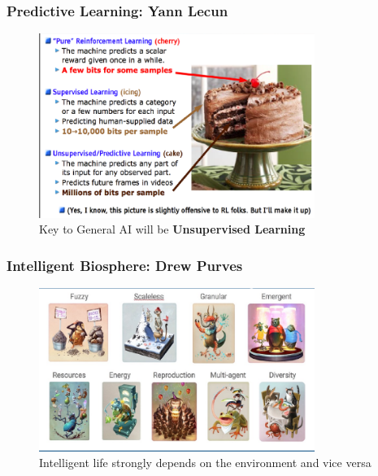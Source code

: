 \documentclass[11pt,
               hyperref={colorlinks,citecolor=pink,linkcolor=red,urlcolor=blue}
               ]{beamer}
\begin{document}
  \begin{frame}
    \frametitle{Predictive Learning: Yann Lecun}

    \begin{figure}
      \centering
      \caption*{Key to General AI will be \textbf{Unsupervised Learning}\footnotemark[1]}
      \includegraphics[width=0.8\textwidth]{generalAI1.png}
    \end{figure}

  \end{frame}

  \begin{frame}
    \frametitle{Intelligent Biosphere: Drew Purves}

    \begin{figure}
      \centering
      \caption*{Intelligent life strongly depends on the environment and vice versa\footnotemark[1]}
      \includegraphics[width=0.8\textwidth]{generalAI4.png}
    \end{figure}

  \end{frame}
\end{document}
